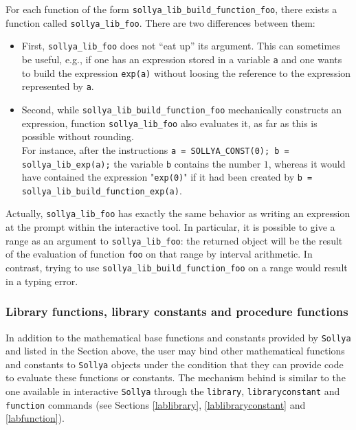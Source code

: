 \documentclass[a4paper]{article}
\newcommand{\sollya}{\texttt{Sollya}\xspace}
\begin{document}
For each function of the form \verb|sollya_lib_build_function_foo|, there exists a function called \verb|sollya_lib_foo|. There are two differences between them:
\begin{itemize}
\item First, \verb|sollya_lib_foo| does not ``eat up'' its argument. This can sometimes be useful, e.g., if one has an expression stored in a variable \texttt{a} and one wants to build the expression \texttt{exp(a)} without loosing the reference to the expression represented by \texttt{a}.
\item Second, while \verb|sollya_lib_build_function_foo| mechanically constructs an expression, function \verb|sollya_lib_foo| also evaluates it, as far as this is possible without rounding.\\
For instance, after the instructions \verb|a = SOLLYA_CONST(0); b = sollya_lib_exp(a);| the variable \texttt{b} contains the number $1$, whereas it would have contained the expression "\texttt{exp(0)}" if it had been created by \verb|b = sollya_lib_build_function_exp(a)|.
\end{itemize}
Actually, \verb|sollya_lib_foo| has exactly the same behavior as writing an expression at the prompt within the interactive tool. In particular, it is possible to give a range as an argument to \verb|sollya_lib_foo|: the returned object will be the result of the evaluation of function \verb|foo| on that range by interval arithmetic. In contrast, trying to use \verb|sollya_lib_build_function_foo| on a range would result in a typing error.

\subsubsection{Library functions, library constants and procedure functions}

In addition to the mathematical base functions and constants provided
by \sollya and listed in the Section above, the user may bind other
mathematical functions and constants to \sollya objects under the
condition that they can provide code to evaluate these functions or
constants. The mechanism behind is similar to the one available in
interactive \sollya through the {\tt library}, {\tt libraryconstant}
and {\tt function} commands (see Sections \ref{lablibrary},
\ref{lablibraryconstant} and \ref{labfunction}).
\end{document}
